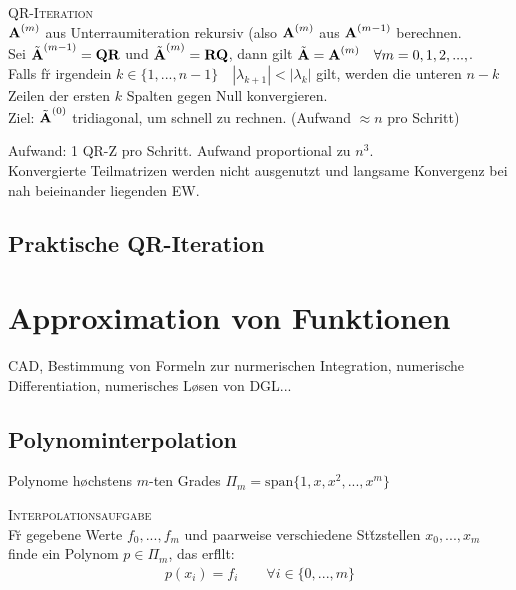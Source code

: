 \textsc{QR-Iteration}\\
$\mbox{\bf A}^{(m)}$ aus Unterraumiteration rekursiv (also $\mbox{\bf A}^{(m)}$ aus $\mbox{\bf A}^{(m-1)}$ berechnen.\\
Sei $\tilde{\mbox{\bf A}}^{(m-1)} = \mbox{\bf QR}$ und $\tilde{\mbox{\bf A}}^{(m)} = \mbox{\bf RQ}$, dann gilt $\tilde{\mbox{\bf A}}=\mbox{\bf A}^{(m)} \quad \forall m=0,1,2,...,$.\\ 
Falls f\u r irgendein $k \in \{1,...,n-1\} \quad |\lambda_{k+1}|<|\lambda_k|$ gilt, werden die unteren $n-k$ Zeilen der ersten $k$ Spalten gegen Null konvergieren.\\
Ziel: $\tilde{\mbox{\bf A}}^{(0)}$ tridiagonal, um schnell zu rechnen. (Aufwand $\approx n$ pro Schritt)
\vspace{0.2cm}

Aufwand: 1 QR-Z pro Schritt. Aufwand proportional zu $n^3$.\\
Konvergierte Teilmatrizen werden nicht ausgenutzt und langsame Konvergenz bei nah beieinander liegenden EW.

\subsection{Praktische QR-Iteration}


\section{Approximation von Funktionen}
CAD, Bestimmung von Formeln zur nurmerischen Integration, numerische Differentiation, numerisches L\o sen von DGL...

\subsection{Polynominterpolation}
Polynome h\o chstens $m$-ten Grades $\Pi_m = \text{span}\{1,x,x^2,...,x^m\}$

\textsc{Interpolationsaufgabe}\\
F\u r gegebene Werte $f_0, ..., f_m$ und paarweise verschiedene St\u tzstellen $x_0, ..., x_m$ finde ein Polynom $p \in \Pi_m$, das erf\u llt:
\begin{align*}
p(x_i)=f_i \qquad \forall i\in \{0,...,m\}
\end{align*}\vspace{0.2cm}

